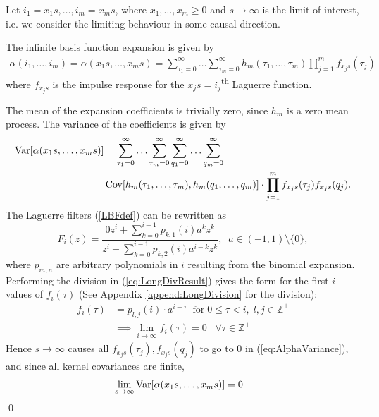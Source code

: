 \begin{proof*}
Let $i_1 = x_1 s, \hdots, i_m=x_m s$, where $x_1, \hdots, x_m \geq 0$ and $s \to \infty$ is the limit of interest, i.e. we consider the limiting behaviour in some causal direction. 

The infinite basis function expansion is given by
\begin{align}
\alpha(i_1, \hdots, i_m) = \alpha(x_1 s, \hdots, x_m s) = \sum_{\tau_1=0}^{\infty} \hdots \sum_{\tau_m=0}^{\infty} h_m(\tau_1, \hdots, \tau_m) \prod_{j=1}^{m} f_{x_j s}(\tau_j)
\end{align}
where $f_{x_j s}$ is the impulse response for the $x_j s = i_j$\textsuperscript{th} Laguerre function. 

The mean of the expansion coefficients is trivially zero, since $h_m$ is a zero mean process.
The variance of the coefficients is given by
\begin{align}
\label{eq:AlphaVariance}
\operatorname{Var}[\alpha(x_1 s, \hdots, x_m s)] &= \sum_{\tau_1=0}^{\infty} \hdots \sum_{\tau_m=0}^{\infty} \sum_{q_1=0}^{\infty} \hdots \sum_{q_m=0}^{\infty} \nonumber \\ 
&\operatorname{Cov}[h_m(\tau_1, \hdots, \tau_m),h_m(q_1, \hdots, q_m)] \cdot \prod_{j=1}^{m} f_{x_j s}(\tau_j) f_{x_j s}(q_j). 
\end{align}
The Laguerre filters (\ref{LBFdef}) can be rewritten as
\begin{equation}
\label{eq:LongDivResult}
F_i(z)=\frac{0z^i + \sum_{k=0}^{i-1} p_{k,1}(i) a^k z^k}{z^i + \sum_{k=0}^{i-1} p_{k,2}(i) a^{i-k} z^k}, \; \; a \in (-1,1) \setminus \{0\},
\end{equation}
where $p_{m,n}$ are arbitrary polynomials in $i$ resulting from the binomial expansion.
Performing the division in (\ref{eq:LongDivResult}) gives the form for the first $i$ values of $f_i(\tau)$ (See Appendix \ref{append:LongDivision} for the division):
\begin{align*}
f_i(\tau) &= p_{l,j}(i)\cdot a^{i-\tau} \; \; \text{for} \; 0 \leq \tau<i , \; l,j \in \mathbb{Z}^+ \\
&\implies \lim_{i \to \infty} f_i(\tau) = 0\; \; \; \forall \tau \in \mathbb{Z}^+ 
\end{align*}
Hence $s \to \infty$ causes all $ f_{x_j s}(\tau_j), f_{x_j s}(q_j)$ to go to $0$ in (\ref{eq:AlphaVariance}), and since all kernel covariances are finite,
\begin{align*}
&\lim_{s \to \infty} \operatorname{Var}[\alpha(x_1 s, \hdots, x_m s)] = 0 
\end{align*} \qed
\end{proof*}

